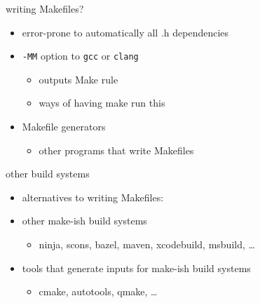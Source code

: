 \begin{frame}{writing Makefiles?}
\begin{itemize}
\item error-prone to automatically all .h dependencies
\vspace{.5cm}
\item \texttt{-MM} option to \texttt{gcc} or \texttt{clang}
    \begin{itemize}
    \item outputs Make rule
    \item ways of having make run this
    \end{itemize}
\item Makefile generators
    \begin{itemize}
    \item other programs that write Makefiles
    \end{itemize}
\end{itemize}
\end{frame}

\begin{frame}{other build systems}
\begin{itemize}
\item alternatives to writing Makefiles:
\vspace{.25cm}
\item other make-ish build systems
    \begin{itemize}
    \item ninja, scons, bazel, maven, xcodebuild, msbuild, \ldots
    \end{itemize}
\item tools that generate inputs for make-ish build systems
    \begin{itemize}
    \item cmake, autotools, qmake, \ldots
    \end{itemize}
\end{itemize}
\end{frame}

